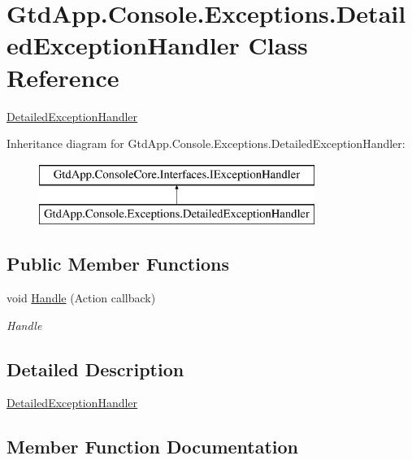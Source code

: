 \hypertarget{class_gtd_app_1_1_console_1_1_exceptions_1_1_detailed_exception_handler}{}\section{Gtd\+App.\+Console.\+Exceptions.\+Detailed\+Exception\+Handler Class Reference}
\label{class_gtd_app_1_1_console_1_1_exceptions_1_1_detailed_exception_handler}


\mbox{\hyperlink{class_gtd_app_1_1_console_1_1_exceptions_1_1_detailed_exception_handler}{Detailed\+Exception\+Handler}}  


Inheritance diagram for Gtd\+App.\+Console.\+Exceptions.\+Detailed\+Exception\+Handler\+:\begin{figure}[H]
\begin{center}
\leavevmode
\includegraphics[height=2.000000cm]{class_gtd_app_1_1_console_1_1_exceptions_1_1_detailed_exception_handler}
\end{center}
\end{figure}
\subsection*{Public Member Functions}
\begin{DoxyCompactItemize}
\item 
void \mbox{\hyperlink{class_gtd_app_1_1_console_1_1_exceptions_1_1_detailed_exception_handler_a27a7e6418026056bcc76096165124e65}{Handle}} (Action callback)
\begin{DoxyCompactList}\small\item\em Handle \end{DoxyCompactList}\end{DoxyCompactItemize}


\subsection{Detailed Description}
\mbox{\hyperlink{class_gtd_app_1_1_console_1_1_exceptions_1_1_detailed_exception_handler}{Detailed\+Exception\+Handler}} 



\subsection{Member Function Documentation}
\mbox{\label{class_gtd_app_1_1_console_1_1_exceptions_1_1_detailed_exception_handler_a27a7e6418026056bcc76096165124e65}} 
